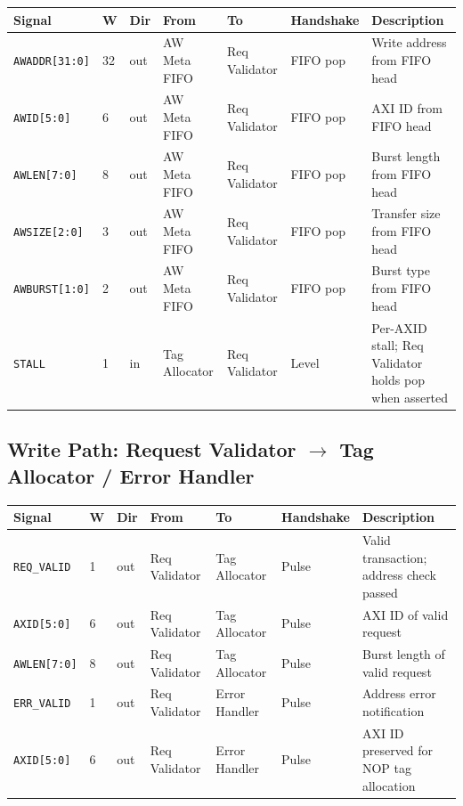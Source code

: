 \documentclass[11pt,a4paper]{article}
\begin{document}
\begin{tabularx}{\textwidth}{L{3.0cm} C{0.8cm} C{1.0cm} L{2.2cm} L{2.2cm} L{2.0cm} X}
\toprule
\textbf{Signal} & \textbf{W} & \textbf{Dir} & \textbf{From} & \textbf{To} & \textbf{Handshake} & \textbf{Description} \\
\midrule
\texttt{AWADDR[31:0]}  & 32 & out & AW Meta FIFO & Req Validator & FIFO pop & Write address from FIFO head \\
\texttt{AWID[5:0]}     & 6  & out & AW Meta FIFO & Req Validator & FIFO pop & AXI ID from FIFO head \\
\texttt{AWLEN[7:0]}    & 8  & out & AW Meta FIFO & Req Validator & FIFO pop & Burst length from FIFO head \\
\texttt{AWSIZE[2:0]}   & 3  & out & AW Meta FIFO & Req Validator & FIFO pop & Transfer size from FIFO head \\
\texttt{AWBURST[1:0]}  & 2  & out & AW Meta FIFO & Req Validator & FIFO pop & Burst type from FIFO head \\
\texttt{STALL}         & 1  & in  & Tag Allocator & Req Validator & Level & Per-AXID stall; Req Validator holds pop when asserted \\
\bottomrule
\end{tabularx}

\subsection{Write Path: Request Validator $\rightarrow$ Tag Allocator / Error Handler}

\begin{tabularx}{\textwidth}{L{3.0cm} C{0.8cm} C{1.0cm} L{2.2cm} L{2.2cm} L{2.0cm} X}
\toprule
\textbf{Signal} & \textbf{W} & \textbf{Dir} & \textbf{From} & \textbf{To} & \textbf{Handshake} & \textbf{Description} \\
\midrule
\texttt{REQ\_VALID}      & 1 & out & Req Validator & Tag Allocator & Pulse & Valid transaction; address check passed \\
\texttt{AXID[5:0]}       & 6 & out & Req Validator & Tag Allocator & Pulse & AXI ID of valid request \\
\texttt{AWLEN[7:0]}      & 8 & out & Req Validator & Tag Allocator & Pulse & Burst length of valid request \\
\midrule
\texttt{ERR\_VALID}      & 1 & out & Req Validator & Error Handler  & Pulse & Address error notification \\
\texttt{AXID[5:0]}       & 6 & out & Req Validator & Error Handler  & Pulse & AXI ID preserved for NOP tag allocation \\
\bottomrule
\end{tabularx}
\end{document}
